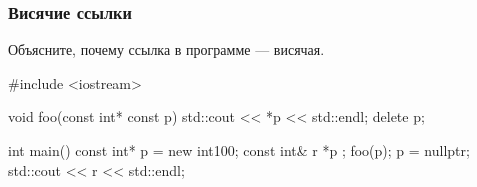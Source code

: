 \documentclass[compress, 8pt]{beamer}
\begin{document}
\begin{frame}[fragile]

    \frametitle{Висячие ссылки}

    \begin{task}
        Объясните, почему ссылка в программе --- висячая.
    \end{task}

    \begin{myinplacelisting}[minted language=cpp]
#include <iostream>

void foo(const int* const p) {
    std::cout << *p << std::endl;
    delete p;
}

int main() {
    const int* p = new int{100};
    const int& r { *p };
    foo(p);
    p = nullptr;
    std::cout << r << std::endl;
}
    \end{myinplacelisting}

\end{frame}
\end{document}

